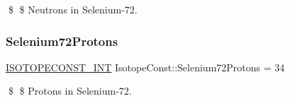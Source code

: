 \$ \$ Neutrons in Selenium-\/72. \mbox{\label{group___isotope_const-_selenium-_se72_ga010f0c852078d0b535616d7a10291dc5}} 
\subsubsection{\texorpdfstring{Selenium72\+Protons}{Selenium72Protons}}
{\footnotesize\ttfamily \mbox{\hyperlink{group___isotope_const-_macros_ga5f18360b3e99483a35c32d789e62621c}{I\+S\+O\+T\+O\+P\+E\+C\+O\+N\+S\+T\+\_\+\+I\+NT}} Isotope\+Const\+::\+Selenium72\+Protons = 34}

\$ \$ Protons in Selenium-\/72. 